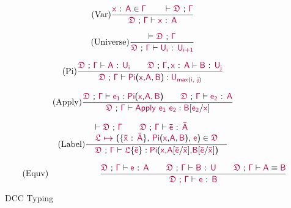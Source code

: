 \begin{figure}
\renewcommand{\arraystretch}{1.3}
	\begin{equation}
		\tag{Var}
		\frac
			{\itemtype{x}{A} \in \target{\Gamma} \qquad
			 \vdash \target{\fdef}\ \textsf{;}\ \target{\Gamma} }
			{\target{\fdef}\ \textsf{;}\ \target{\Gamma} \vdash \itemtype{x}{A}}
	\end{equation}

	\begin{equation}
		\tag{Universe}
		\frac
			{\vdash \target{\fdef}\ \textsf{;}\ \target{\Gamma} }
			{\target{\fdef}\ \textsf{;}\ \target{\Gamma} \vdash \itemtype{U_i}{U_{i+1}}}
	\end{equation}

	\begin{equation}
		\tag{Pi}
		\frac
			{\target{\fdef}\ \textsf{;}\ \target{\Gamma} \vdash \itemtype{A}{U_i} \qquad
			 \target{\fdef}\ \textsf{;}\ \target{\Gamma}, \itemtype{x}{A} \vdash \itemtype{B}{U_j}
			}
			{\target{\fdef}\ \textsf{;}\ \target{\Gamma} \vdash \targetpi{x}{A}{B} : \target{U}_{\target{max}(\target{i},\ \target{j})} }
	\end{equation}

	\begin{equation}
		\tag{Apply}
		\frac
			{\target{\fdef}\ \textsf{;}\ \target{\Gamma} \vdash \target{e_1} : \targetpi{x}{A}{B} \qquad
			 \target{\fdef}\ \textsf{;}\ \target{\Gamma} \vdash \itemtype{e_2}{A} }
			{\target{\fdef}\ \textsf{;}\ \target{\Gamma} \vdash \targetapp{e_1}{e_2} : \target{B} \targetsub{e_2}{x}}
	\end{equation}

	\begin{equation}
		\tag{Label}
		\frac
			{\begin{array}{l}
			  	\vdash \target{\fdef}\ \textsf{;}\ \target{\Gamma} \qquad \target{\fdef}\ \textsf{;}\ \target{\Gamma} \vdash \itemtype{\bar{e}}{\bar{A}} \\
			  	\itemdef{\target{\flabel}}{\itemtype{\bar{x}}{\bar{A}}}{\targetpi{x}{A}{B}}{\target{e}} \in \target{\fdef} \\
			 \end{array}	 
			}
			{\quad \target{\fdef}\ \textsf{;}\ \target{\Gamma} \vdash \targetlab{\flabel}{\bar{e}} : 
			 \target{Pi}\textsf{(}\target{x}\textsf{,} \target{A} \targetsub{\bar{e}}{\bar{x}}\textsf{,} \target{B} \targetsub{\bar{e}}{\bar{x}}\textsf{)} \quad
			}
	\end{equation}

	\begin{equation}
		\tag{Equv}
		\qquad\qquad\qquad
		\frac
			{\target{\fdef}\ \textsf{;}\ \target{\Gamma} \vdash \itemtype{e}{A} \qquad
			 \target{\fdef}\ \textsf{;}\ \target{\Gamma} \vdash \itemtype{B}{U} \qquad
			 \target{\fdef}\ \textsf{;}\ \target{\Gamma} \vdash \target{A} \equiv \target{B}
			}
			{\target{\fdef}\ \textsf{;}\ \target{\Gamma} \vdash \itemtype{e}{B}}
	\end{equation}
	\caption{DCC Typing}
    \label{fig:dcc typing}
\end{figure}

